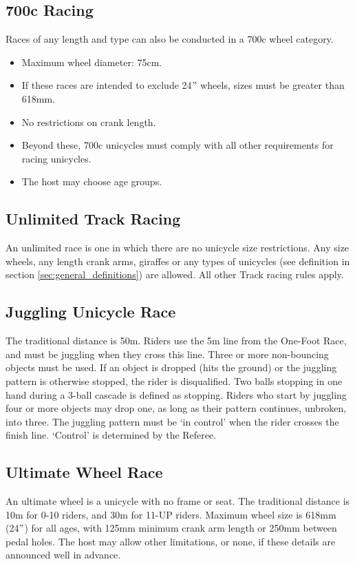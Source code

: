 \subsection{700c Racing}
Races of any length and type can also be conducted in a 700c wheel category.
\begin{itemize}
\item Maximum wheel diameter: 75cm.
\item If these races are intended to exclude 24$"$ wheels, sizes must be greater than 618mm.
\item No restrictions on crank length.
\item Beyond these, 700c unicycles must comply with all other requirements for racing unicycles.
\item The host may choose age groups.
\end{itemize}

\subsection{Unlimited Track Racing}
An unlimited race is one in which there are no unicycle size restrictions.
Any size wheels, any length crank arms, giraffes or any types of unicycles (see definition in section \ref{sec:general_definitions}) are allowed.
All other Track racing rules apply.

\subsection{Juggling Unicycle Race}
The traditional distance is 50m.
Riders use the 5m line from the One-Foot Race, and must be juggling when they cross this line.
Three or more non-bouncing objects must be used.
If an object is dropped (hits the ground) or the juggling pattern is otherwise stopped, the rider is disqualified.
Two balls stopping in one hand during a 3-ball cascade is defined as stopping.
Riders who start by juggling four or more objects may drop one, as long as their pattern continues, unbroken, into three.
The juggling pattern must be ‘in control' when the rider crosses the finish line.
‘Control' is determined by the Referee.

\subsection{Ultimate Wheel Race}
An ultimate wheel is a unicycle with no frame or seat.
The traditional distance is 10m for 0-10 riders, and 30m for 11-UP riders.
Maximum wheel size is 618mm (24$"$) for all ages, with 125mm minimum crank arm length or 250mm between pedal holes.
The host may allow other limitations, or none, if these details are announced well in advance.

